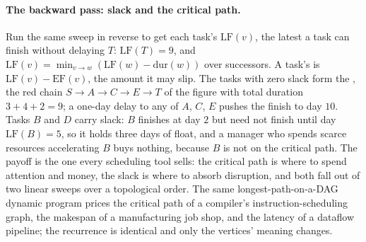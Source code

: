 \paragraph{The backward pass: slack and the critical path.}
Run the same sweep in reverse to get each task's 
$\mathrm{LF}(v)$, the latest a task can finish without delaying $T$:
$\mathrm{LF}(T) = 9$, and $\mathrm{LF}(v) = \min_{v \to w}
(\mathrm{LF}(w) - \mathrm{dur}(w))$ over successors. A task's
 is $\mathrm{LF}(v) - \mathrm{EF}(v)$, the amount it may
slip. The tasks with zero slack form the , the
red chain $S \to A \to C \to E \to T$ of the figure with total duration
$3 + 4 + 2 = 9$; a one-day delay to any of $A$, $C$, $E$ pushes the
finish to day $10$. Tasks $B$ and $D$ carry slack: $B$ finishes at day
$2$ but need not finish until day $\mathrm{LF}(B) = 5$, so it holds
three days of float, and a manager who spends scarce resources
accelerating $B$ buys nothing, because $B$ is not on the critical path.
The payoff is the one every scheduling tool sells: the critical path is
where to spend attention and money, the slack is where to absorb
disruption, and both fall out of two linear sweeps over a topological
order. The same longest-path-on-a-DAG dynamic program prices the
critical path of a compiler's instruction-scheduling graph, the makespan
of a manufacturing job shop, and the latency of a dataflow pipeline; the
recurrence is identical and only the vertices' meaning changes.

